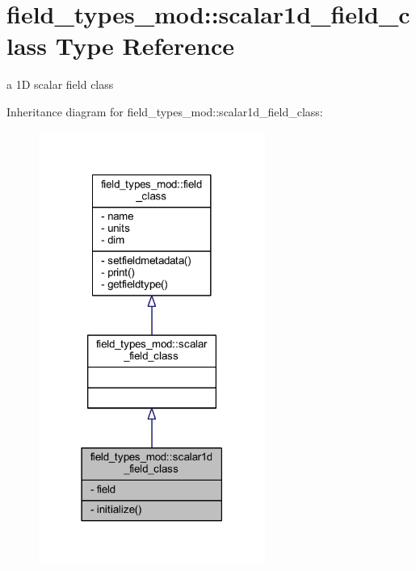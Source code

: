 \hypertarget{structfield__types__mod_1_1scalar1d__field__class}{}\section{field\+\_\+types\+\_\+mod\+:\+:scalar1d\+\_\+field\+\_\+class Type Reference}
\label{structfield__types__mod_1_1scalar1d__field__class}


a 1D scalar field class  




Inheritance diagram for field\+\_\+types\+\_\+mod\+:\+:scalar1d\+\_\+field\+\_\+class\+:
\nopagebreak
\begin{figure}[H]
\begin{center}
\leavevmode
\includegraphics[width=210pt]{structfield__types__mod_1_1scalar1d__field__class__inherit__graph}
\end{center}
\end{figure}


